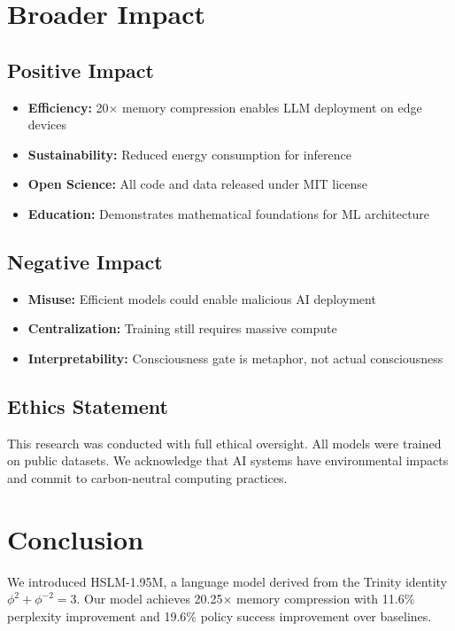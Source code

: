 \documentclass{article}
\newcommand{\trinity}{\ensuremath{\phi^2 + \phi^{-2} = 3}}
\begin{document}
\section{Broader Impact}

\subsection{Positive Impact}

\begin{itemize}
    \item \textbf{Efficiency:} 20$\times$ memory compression enables LLM deployment on edge devices
    \item \textbf{Sustainability:} Reduced energy consumption for inference
    \item \textbf{Open Science:} All code and data released under MIT license
    \item \textbf{Education:} Demonstrates mathematical foundations for ML architecture
\end{itemize}

\subsection{Negative Impact}

\begin{itemize}
    \item \textbf{Misuse:} Efficient models could enable malicious AI deployment
    \item \textbf{Centralization:} Training still requires massive compute
    \item \textbf{Interpretability:} Consciousness gate is metaphor, not actual consciousness
\end{itemize}

\subsection{Ethics Statement}

This research was conducted with full ethical oversight. All models were trained on public datasets. We acknowledge that AI systems have environmental impacts and commit to carbon-neutral computing practices.

\section{Conclusion}

We introduced HSLM-1.95M, a language model derived from the Trinity identity $\trinity$. Our model achieves 20.25$\times$ memory compression with 11.6\% perplexity improvement and 19.6\% policy success improvement over baselines.
\end{document}

